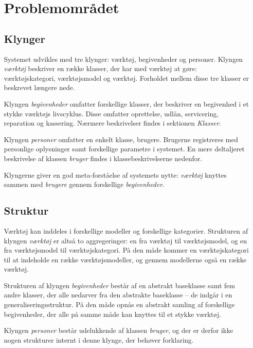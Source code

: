 \documentclass{article}
\begin{document}
\section{Problemområdet}

\subsection{Klynger}

Systemet udvikles med tre klynger: værktøj, begivenheder og personer. Klyngen \emph{værktøj} beskriver en række klasser, der har med værktøj at gøre: værktøjskategori, værktøjsmodel og værktøj. Forholdet mellem disse tre klasser er beskrevet længere nede.

Klyngen \emph{begivenheder} omfatter forskellige klasser, der beskriver en begivenhed i et stykke værktøjs livscyklus. Disse omfatter oprettelse, udlån, servicering, reparation og kassering. Nærmere beskrivelser findes i sektionen \emph{Klasser}.

Klyngen \emph{personer} omfatter en enkelt klasse, brugere. Brugerne registreres med personlige oplysninger samt forskellige parametre i systemet. En mere deltaljeret beskrivelse af klassen \emph{bruger} findes i klassebeskrivelserne nedenfor.

Klyngerne giver en god meta-forståelse af systemets nytte: \emph{værktøj} knyttes sammen med \emph{brugere} gennem forskellige \emph{begivenheder}.

\subsection{Struktur}

Værktøj kan inddeles i forskellige modeller og forskellige kategorier. Strukturen af klyngen \emph{værktøj} er altså to aggregeringer: en fra værktøj til værktøjsmodel, og en fra værktøjsmodel til værktøjskategori. På den måde kommer en værktøjskategori til at indeholde en række værktøjsmodeller, og gennem modellerne også en række værktøj.

Strukturen af klyngen \emph{begivenheder} består af en abstrakt baseklasse samt fem andre klasser, der alle nedarver fra den abstrakte baseklasse -- de indgår i en generaliseringsstruktur. På den måde opnås en abstrakt samling af forskellige begivenheder, der alle på samme måde kan knyttes til et stykke værktøj.

Klyngen \emph{personer} består udelukkende af klassen \emph{bruger}, og der er derfor ikke nogen strukturer internt i denne klynge, der behøver forklaring.
\end{document}
